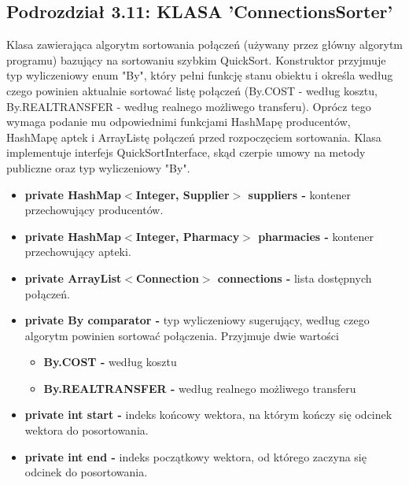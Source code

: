 \documentclass[a4paper]{article}
\begin{document}
\subsection*{Podrozdział 3.11: KLASA 'ConnectionsSorter'}
\begin{flushleft}
Klasa zawierająca algorytm sortowania połączeń (używany przez główny algorytm programu) bazujący na sortowaniu szybkim QuickSort. Konstruktor przyjmuje typ wyliczeniowy enum "By", który pełni funkcję stanu obiektu i określa według czego powinien aktualnie sortować listę połączeń (By.COST - według kosztu, By.REALTRANSFER - według realnego możliwego transferu). Oprócz tego wymaga podanie mu odpowiednimi funkcjami HashMapę producentów, HashMapę aptek i ArrayListę połączeń przed rozpoczęciem sortowania. 
\newline Klasa implementuje interfejs QuickSortInterface, skąd czerpie umowy na metody publiczne oraz typ wyliczeniowy "By".
\end{flushleft} 
\begin{itemize}
\item \textbf{private HashMap$<$Integer, Supplier$>$ suppliers -} kontener przechowujący producentów.
\item \textbf{private HashMap$<$Integer, Pharmacy$>$ pharmacies -} kontener przechowujący apteki.
\item \textbf{private ArrayList$<$Connection$>$ connections -} lista dostępnych połączeń.
\item \textbf{private By comparator -} typ wyliczeniowy sugerujący, według czego algorytm powinien sortować połączenia. Przyjmuje dwie wartości
	\begin{itemize}
	\item \textbf{By.COST -} według kosztu
	\item \textbf{By.REALTRANSFER -} według realnego możliwego transferu
	\end{itemize}
\item \textbf{private int start -} indeks końcowy wektora, na którym kończy się odcinek wektora do posortowania.
\item \textbf{private int end -} indeks początkowy wektora, od którego zaczyna się odcinek do posortowania.
\end{itemize}
\end{document}
